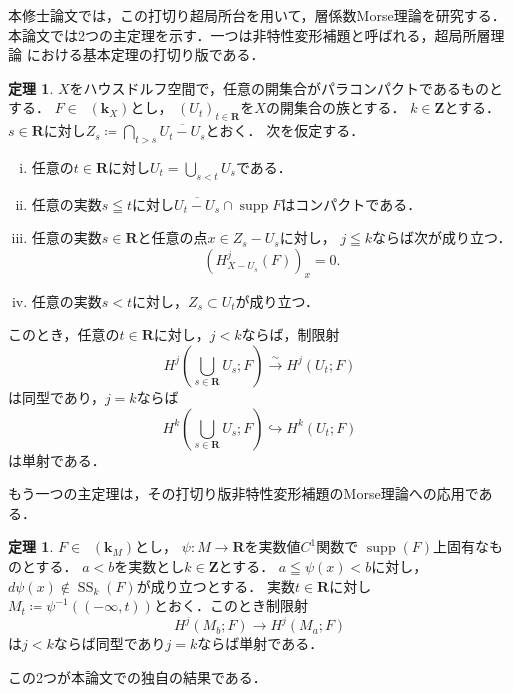 ﻿\documentclass[a4paper]{jsarticle}
\theoremstyle{definition}
\newcommand{\zz}{\mathbf{Z}}
\newcommand{\rr}{\mathbf{R}}
\newcommand{\kk}{\mathbf{k}}
\numberwithin{equation}{section}
\newcommand{\supp}{\mathop{\mathrm{supp}}\nolimits}
\newcommand{\Dompl}{\mathop{\mathsf{D}^\mathrm{+}}\nolimits}
\newcommand{\Dompb}{\mathop{\mathsf{D}^\mathrm{b}}\nolimits}
\newcommand{\muS}[1][]{\mathop{\mathrm{SS}}\nolimits_{#1}}
\newcommand{\simar}{\mathrel{\overset{\sim}{\rightarrow}}}%
\theoremstyle{mystyle}
\newtheorem{THM}[AXM]{定理}
\newcommand{\smi}{-}
\begin{document}
\begin{gaiyo}
  本修士論文では，この打切り超局所台を用いて，層係数Morse理論を研究する．
  本論文では2つの主定理を示す．一つは非特性変形補題と呼ばれる，超局所層理論
  における基本定理の打切り版である．
  \begin{THM}
    \(X\)をハウスドルフ空間で，任意の開集合がパラコンパクトであるものとする．
    \(F\in\Dompl(\kk_X)\)とし，
    \(\left(U_{t}\right)_{t\in\rr}\)を\(X\)の開集合の族とする．
    \(k\in\zz\)とする．
    \(s\in\rr\)に対し\(
      Z_{s}\coloneqq \bigcap_{t>s}\overline{U_t\smi U_s}
    \)とおく．
    次を仮定する．
    \begin{enumerate}[(i)]
      \item \label{item:t-nonchar1}
      任意の\(t\in\rr\)に対し\(U_{t}=\bigcup_{s<t}U_{s}\)である．
      \item \label{item:t-nonchar2}
      任意の実数\(s\leqq t\)に対し\(
        \overline{U_{t}\smi U_{s}}\cap \supp{F}
      \)はコンパクトである．
      \item \label{item:t-nonchar3}
      任意の実数\(s\in\rr\)と任意の点\(x\in Z_{s}\smi U_{s}\)に対し，
      \(j\leqq k\)ならば次が成り立つ．
      \[
        (H^{j}_{X\smi U_{s}}(F))_{x}=0. 
      \]
      \item \label{item:t-nonchar4} 
      任意の実数\(s< t\)に対し，\(Z_s\subset U_{t}\)が成り立つ．
    \end{enumerate}
    このとき，任意の\(t\in\rr\)に対し，\(j<k\)ならば，制限射\[
      H^{j}\left(\bigcup_{s\in\rr}U_{s};F\right)
      \simar 
      H^{j}\left(U_{t};F\right)
    \]は同型であり，\(j=k\)ならば\[
      H^{k}\left(\bigcup_{s\in\rr}U_{s};F\right)
      \hookrightarrow 
      H^{k}\left(U_{t};F\right)
    \]は単射である．
  \end{THM}
  もう一つの主定理は，その打切り版非特性変形補題のMorse理論への応用である．
  \begin{THM}\label{thm:t-morse}
    \(F\in\Dompb(\kk_M)\)とし，
    \(\psi\colon M\to \rr\)を実数値\(C^1\)関数で
    \(\supp(F)\)上固有なものとする．
    \(a<b\)を実数とし\(k\in\zz\)とする．
    \(
      a\leqq \psi(x)<b
    \)に対し，\(d\psi(x)\notin \muS[k](F)\)が成り立つとする．
    実数\(t\in \rr\)に対し\(
      M_t\coloneqq\psi^{-1}\left((-\infty,t)\right)
    \)とおく．このとき制限射
    \[
      H^{j}(M_{b};F)\to H^{j}(M_{a};F)
    \]
    は\(j< k\)ならば同型であり\(j=k\)ならば単射である．
  \end{THM}
  この2つが本論文での独自の結果である．


\end{gaiyo}
\end{document}
